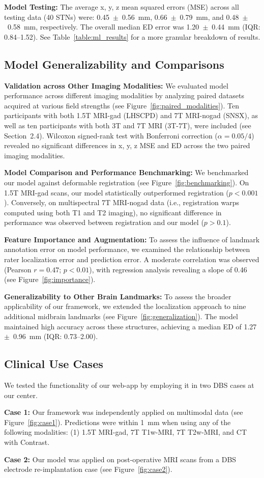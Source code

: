 \textbf{Model Testing:} The average x, y, z mean squared errors (MSE) across all testing data (40 STNs) were: 0.45~$\pm$~0.56~mm, 0.66~$\pm$~0.79~mm, and 0.48~$\pm$~0.58~mm, respectively. The overall median ED error was 1.20~$\pm$~0.44~mm (IQR: 0.84–1.52). See Table~\ref{table:ml_results} for a more granular breakdown of results.

\subsection{Model Generalizability and Comparisons}

\textbf{Validation across Other Imaging Modalities:} We evaluated model performance across different imaging modalities by analyzing paired datasets acquired at various field strengths (see Figure~\ref{fig:paired_modalities}). Ten participants with both 1.5T MRI-gad (LHSCPD) and 7T MRI-nogad (SNSX), as well as ten participants with both 3T and 7T MRI (3T-7T), were included (see Section~2.4). Wilcoxon signed-rank test with Bonferroni correction ($\alpha = 0.05/4$) revealed no significant differences in x, y, z MSE and ED across the two paired imaging modalities.

\textbf{Model Comparison and Performance Benchmarking:} We benchmarked our model against deformable registration (see Figure~\ref{fig:benchmarking}). On 1.5T MRI-gad scans, our model statistically outperformed registration ($p < 0.001$). Conversely, on multispectral 7T MRI-nogad data (i.e., registration warps computed using both T1 and T2 imaging), no significant difference in performance was observed between registration and our model ($p > 0.1$).

\textbf{Feature Importance and Augmentation:} To assess the influence of landmark annotation error on model performance, we examined the relationship between rater localization error and prediction error. A moderate correlation was observed (Pearson $r = 0.47$; $p < 0.01$), with regression analysis revealing a slope of 0.46 (see Figure~\ref{fig:importance}).

\textbf{Generalizability to Other Brain Landmarks:} To assess the broader applicability of our framework, we extended the localization approach to nine additional midbrain landmarks (see Figure~\ref{fig:generalization}). The model maintained high accuracy across these structures, achieving a median ED of 1.27~$\pm$~0.96~mm (IQR: 0.73–2.00).

\subsection{Clinical Use Cases}
We tested the functionality of our web-app by employing it in two DBS cases at our center.

\textbf{Case 1:} Our framework was independently applied on multimodal data (see Figure~\ref{fig:case1}). Predictions were within 1~mm when using any of the following modalities: (1) 1.5T MRI-gad, 7T T1w-MRI, 7T T2w-MRI, and CT with Contrast.

\textbf{Case 2:} Our model was applied on post-operative MRI scans from a DBS electrode re-implantation case (see Figure~\ref{fig:case2}).

